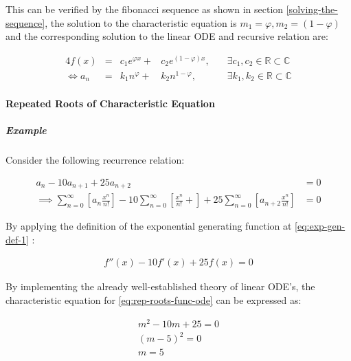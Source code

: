 \documentclass[11pt]{article}
\begin{document}
This can be verified by the fibonacci sequence as shown in section \ref{solving-the-sequence}, the solution to the characteristic equation is \(m_1 = \varphi, m_2 = {\left({ 1-\varphi }\right)}\) and the corresponding solution to the linear ODE and recursive relation are:

\begin{alignat}{4}
    f{\left({ x }\right)} &= &c_1 e^{\varphi x} +  &c_2 e^{{\left({ 1-\varphi }\right)} x}, \quad &\exists c_1, c_2 \in \mathbb{R} \subset \mathbb{C} \nonumber \\
    \iff  a_n &= &k_1 n^{\varphi} +  &k_2 n^{1- \varphi}, &\exists k_1, k_2 \in \mathbb{R} \subset \mathbb{C} \nonumber
\end{alignat}

\paragraph{Repeated Roots of Characteristic Equation}
\label{rep-roots-recurrence}
\subparagraph{Example}
\label{sec:orge50774e}
Consider the following recurrence relation:

\begin{align}
    a_n -  10a_{n+ 1} +  25a_{n+  2}&= 0 \label{eq:hom-repeated-roots-recurrence} \\
    \implies  \sum^{\infty}_{n= 0}   {\left[{ a_n \frac{x^n}{n!} }\right]} - 10 \sum^{\infty}_{n= 0}   {\left[{ \frac{x^n}{n!}+    }\right]} + 25 \sum^{\infty}_{n= 0 }   {\left[{  a_{n+  2 }\frac{x^n}{n!} }\right]}&= 0 \nonumber
\end{align}

By applying the definition of the exponential generating function at \eqref{eq:exp-gen-def-1} :

\begin{align}
    f''{\left({ x }\right)}- 10f'{\left({ x }\right)}+  25f{\left({ x }\right)}= 0 \nonumber \label{eq:rep-roots-func-ode}
\end{align}

By implementing the already well-established theory of linear ODE's, the
characteristic equation for \eqref{eq:rep-roots-func-ode} can be expressed as:

\begin{align}
    m^2- 10m+  25 = 0 \nonumber \\
    {\left({ m- 5 }\right)}^2 = 0 \nonumber \\
    m= 5 \label{eq:rep-roots-recurrence-char-sol}
\end{align}
\end{document}
